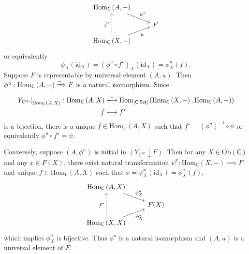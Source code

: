 \begin{prf}
\[\begin{tikzcd}[ampersand replacement=\&, row sep=9pt]
               \mathrm{Hom}_{\mathsf{C}}\left(A,-\right) \arrow[rd, "\phi^u"]\&\\
            \& F\\
             \mathrm{Hom}_{\mathsf{C}}\left(X,-\right) \arrow[ru, "\psi"']\arrow[uu, dashed, "f^\star"]\& 
            \end{tikzcd}
    \]
    or equivalently
    \[
        \psi_X(\mathrm{id}_X)=\left(\phi^u\circ f^\star\right)_X(\mathrm{id}_X)=\phi^u_X(f).
    \]
    Suppose $F$ is representable by universal element $(A,u)$. Then $\phi^u:\mathrm{Hom}_\mathsf{C}\left(A,-\right)\xRightarrow{\sim} F$ is a natural isomorphism. Since
    \begin{align*}
        \left.Y_{\mathsf{C}^{\mathrm{op}}}\right|_{\operatorname{Hom}_{\mathsf{C}}\left(A,X\right)}:\operatorname{Hom}_{\mathsf{C}}\left(A,X\right) &\xlongrightarrow{\sim}\operatorname{Hom}_{[\mathsf{C},\mathsf{Set}]}\left(\operatorname{Hom}_{\mathsf{C}}\left(X,-\right), \operatorname{Hom}_{\mathsf{C}}\left(A,-\right)\right) \\
         f & \longmapsto f^\star
    \end{align*}
    is a bijection, there is a unique $f\in \mathrm{Hom}_{\mathsf{C}}(A,X)$ such that $f^\star=\left(\phi^u\right)^{-1}\circ\psi$ or equivalently $\phi^u\circ f^\star=\psi$.

    Conversely, suppose $(A,\phi^u)$ is initial in $\left(  Y_{\mathsf{C}^{\mathrm{op}}}\downarrow F\right)$. Then for any $ X\in \mathrm{Ob}\left(\mathsf{C}\right)$ and any $x\in F(X)$, there exist natural transformation $\psi^x:\mathrm{Hom}_\mathsf{C}\left(X,-\right)\implies F$ and unique $f\in \mathrm{Hom}_{\mathsf{C}}(A,X)$ such that $x=\psi_X^x(\mathrm{id}_X)=\phi^u_X(f)$,
    \[
        \begin{tikzcd}[ampersand replacement=\&, row sep=9pt]
               \mathrm{Hom}_{\mathsf{C}}\left(A,X\right) \arrow[rd, "\phi^u_X"]\&\\
            \& F(X)\\
             \mathrm{Hom}_{\mathsf{C}}\left(X,X\right) \arrow[ru, "\psi_X^x"']\arrow[uu, dashed, "f^*"]\& 
            \end{tikzcd}
    \]
    which implies $\phi^u_X$ is bijective. Thus $\phi^u$ is a natural isomorphism and $(A,u)$ is a universal element of $F$.
\end{prf}

